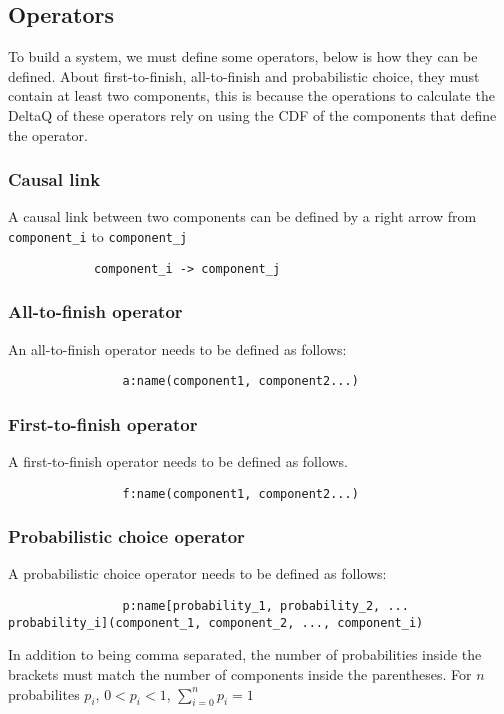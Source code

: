         \subsection{Operators}
        To build a system, we must define some operators, below is how they can be defined. About first-to-finish, all-to-finish and probabilistic choice, they must contain at least two components, this is because the operations to calculate the DeltaQ of these operators rely on using the CDF of the components that define the operator.

        \subsubsection{Causal link}
            A causal link between two components can be defined by a right arrow from \texttt{component\_i} to \texttt{component\_j}
        \begin{verbatim}
            component_i -> component_j 
        \end{verbatim}
        
        \subsubsection{All-to-finish operator}
            An all-to-finish operator needs to be defined as follows:
            \begin{verbatim}
                a:name(component1, component2...)
            \end{verbatim}

        \subsubsection{First-to-finish operator}
            A first-to-finish operator needs to be defined as follows.
            \begin{verbatim}
                f:name(component1, component2...)
            \end{verbatim} 

        \subsubsection{Probabilistic choice operator}
            A probabilistic choice operator needs to be defined as follows:
            \begin{verbatim}
                p:name[probability_1, probability_2, ... probability_i](component_1, component_2, ..., component_i) 
            \end{verbatim}
            In addition to being comma separated, the number of probabilities inside the brackets must match the number of components inside the parentheses. For $n$ probabilites $p_i$, $0 < p_i < 1$, $\sum_{i = 0}^{n} p_i = 1$ 
